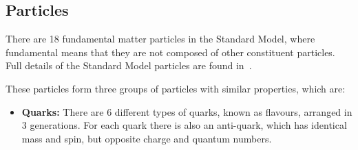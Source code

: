 \subsection{Particles}
\label{sec:theo-sm_particles}

There are 18 fundamental matter particles in the Standard Model,
where fundamental means that they are not composed of other constituent particles.
Full details of the Standard Model particles are found in~\cite{obj-bjets_PDG}.

\noindent
These particles form three groups of particles with similar properties, which are:

\begin{itemize}[leftmargin=*]
\item\textbf{Quarks:}
  There are 6 different types of quarks, known as flavours, arranged in 3 generations.
  For each quark there is also an anti-quark, which has identical mass and spin, but opposite charge and quantum numbers.  \vspace{0.5em}
  


\end{itemize}

